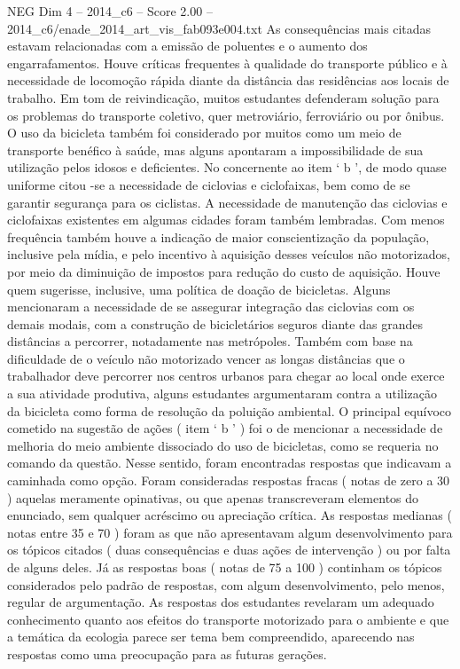 \begin{textsample}{NEG Dim 4 – 2014\_c6 – Score 2.00 – 2014\_c6/enade\_2014\_art\_vis\_fab093e004.txt}
As consequências mais citadas estavam relacionadas com a emissão de poluentes e o aumento dos engarrafamentos.
Houve críticas frequentes à qualidade do transporte público e à necessidade de locomoção rápida diante da distância das residências aos locais de trabalho.
Em tom de reivindicação, muitos estudantes defenderam solução para os problemas do transporte coletivo, quer metroviário, ferroviário ou por ônibus.
O uso da bicicleta também foi considerado por muitos como um meio de transporte benéfico à saúde, mas alguns apontaram a impossibilidade de sua utilização pelos idosos e deficientes.
No concernente ao item ‘ b ’, de modo quase uniforme citou -se a necessidade de ciclovias e ciclofaixas, bem como de se garantir segurança para os ciclistas.
A necessidade de manutenção das ciclovias e ciclofaixas existentes em algumas cidades foram também lembradas.
Com menos frequência também houve a indicação de maior conscientização da população, inclusive pela mídia, e pelo incentivo à aquisição desses veículos não motorizados, por meio da diminuição de impostos para redução do custo de aquisição.
Houve quem sugerisse, inclusive, uma política de doação de bicicletas.
Alguns mencionaram a necessidade de se assegurar integração das ciclovias com os demais modais, com a construção de bicicletários seguros diante das grandes distâncias a percorrer, notadamente nas metrópoles.
Também com base na dificuldade de o veículo não motorizado vencer as longas distâncias que o trabalhador deve percorrer nos centros urbanos para chegar ao local onde exerce a sua atividade produtiva, alguns estudantes argumentaram contra a utilização da bicicleta como forma de resolução da poluição ambiental.
O principal equívoco cometido na sugestão de ações ( item ‘ b ’ ) foi o de mencionar a necessidade de melhoria do meio ambiente dissociado do uso de bicicletas, como se requeria no comando da questão.
Nesse sentido, foram encontradas respostas que indicavam a caminhada como opção.
Foram consideradas respostas fracas ( notas de zero a 30 ) aquelas meramente opinativas, ou que apenas transcreveram elementos do enunciado, sem qualquer acréscimo ou apreciação crítica.
As respostas medianas ( notas entre 35 e 70 ) foram as que não apresentavam algum desenvolvimento para os tópicos citados ( duas consequências e duas ações de intervenção ) ou por falta de alguns deles.
Já as respostas boas ( notas de 75 a 100 ) continham os tópicos considerados pelo padrão de respostas, com algum desenvolvimento, pelo menos, regular de argumentação.
As respostas dos estudantes revelaram um adequado conhecimento quanto aos efeitos do transporte motorizado para o ambiente e que a temática da ecologia parece ser tema bem compreendido, aparecendo nas respostas como uma preocupação para as futuras gerações.

\end{textsample}
